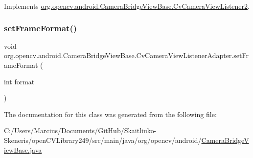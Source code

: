 Implements \mbox{\hyperlink{interfaceorg_1_1opencv_1_1android_1_1_camera_bridge_view_base_1_1_cv_camera_view_listener2_a0c02fc823ee690e08e6076611cff430b}{org.\+opencv.\+android.\+Camera\+Bridge\+View\+Base.\+Cv\+Camera\+View\+Listener2}}.

\mbox{\label{classorg_1_1opencv_1_1android_1_1_camera_bridge_view_base_1_1_cv_camera_view_listener_adapter_a2e6b240e68884aff91670c5d98614180}} 
\subsubsection{\texorpdfstring{set\+Frame\+Format()}{setFrameFormat()}}
{\footnotesize\ttfamily void org.\+opencv.\+android.\+Camera\+Bridge\+View\+Base.\+Cv\+Camera\+View\+Listener\+Adapter.\+set\+Frame\+Format (\begin{DoxyParamCaption}\item[{int}]{format }\end{DoxyParamCaption})}



The documentation for this class was generated from the following file\+:\begin{DoxyCompactItemize}
\item 
C\+:/\+Users/\+Marcius/\+Documents/\+Git\+Hub/\+Skaitliuko-\/\+Skeneris/open\+C\+V\+Library249/src/main/java/org/opencv/android/\mbox{\hyperlink{_camera_bridge_view_base_8java}{Camera\+Bridge\+View\+Base.\+java}}\end{DoxyCompactItemize}
